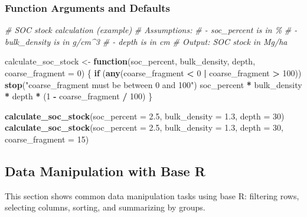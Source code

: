 \documentclass[
  10pt,
  b5paper,
  oneside]{book}
\newenvironment{Shaded}{\begin{snugshade}}{\end{snugshade}}
\newcommand{\AttributeTok}[1]{\textcolor[rgb]{0.13,0.29,0.53}{#1}}
\newcommand{\CommentTok}[1]{\textcolor[rgb]{0.56,0.35,0.01}{\textit{#1}}}
\newcommand{\ControlFlowTok}[1]{\textcolor[rgb]{0.13,0.29,0.53}{\textbf{#1}}}
\newcommand{\DecValTok}[1]{\textcolor[rgb]{0.00,0.00,0.81}{#1}}
\newcommand{\FloatTok}[1]{\textcolor[rgb]{0.00,0.00,0.81}{#1}}
\newcommand{\FunctionTok}[1]{\textcolor[rgb]{0.13,0.29,0.53}{\textbf{#1}}}
\newcommand{\NormalTok}[1]{#1}
\newcommand{\OtherTok}[1]{\textcolor[rgb]{0.56,0.35,0.01}{#1}}
\newcommand{\SpecialCharTok}[1]{\textcolor[rgb]{0.81,0.36,0.00}{\textbf{#1}}}
\newcommand{\StringTok}[1]{\textcolor[rgb]{0.31,0.60,0.02}{#1}}
\begin{document}
\subsubsection{Function Arguments and Defaults}\label{arguments-functions}

\begin{Shaded}
\begin{Highlighting}[]
\CommentTok{\# SOC stock calculation (example)}
\CommentTok{\# Assumptions:}
\CommentTok{\# {-} soc\_percent is in \%}
\CommentTok{\# {-} bulk\_density is in g/cm\^{}3}
\CommentTok{\# {-} depth is in cm}
\CommentTok{\# Output: SOC stock in Mg/ha}

\NormalTok{calculate\_soc\_stock }\OtherTok{\textless{}{-}} \ControlFlowTok{function}\NormalTok{(soc\_percent, bulk\_density, depth, }\AttributeTok{coarse\_fragment =} \DecValTok{0}\NormalTok{) \{}
  \ControlFlowTok{if}\NormalTok{ (}\FunctionTok{any}\NormalTok{(coarse\_fragment }\SpecialCharTok{\textless{}} \DecValTok{0} \SpecialCharTok{|}\NormalTok{ coarse\_fragment }\SpecialCharTok{\textgreater{}} \DecValTok{100}\NormalTok{)) }\FunctionTok{stop}\NormalTok{(}\StringTok{"coarse\_fragment must be between 0 and 100"}\NormalTok{)}
\NormalTok{  soc\_percent }\SpecialCharTok{*}\NormalTok{ bulk\_density }\SpecialCharTok{*}\NormalTok{ depth }\SpecialCharTok{*}\NormalTok{ (}\DecValTok{1} \SpecialCharTok{{-}}\NormalTok{ coarse\_fragment }\SpecialCharTok{/} \DecValTok{100}\NormalTok{)}
\NormalTok{\}}

\FunctionTok{calculate\_soc\_stock}\NormalTok{(}\AttributeTok{soc\_percent =} \FloatTok{2.5}\NormalTok{, }\AttributeTok{bulk\_density =} \FloatTok{1.3}\NormalTok{, }\AttributeTok{depth =} \DecValTok{30}\NormalTok{)}
\FunctionTok{calculate\_soc\_stock}\NormalTok{(}\AttributeTok{soc\_percent =} \FloatTok{2.5}\NormalTok{, }\AttributeTok{bulk\_density =} \FloatTok{1.3}\NormalTok{, }\AttributeTok{depth =} \DecValTok{30}\NormalTok{, }\AttributeTok{coarse\_fragment =} \DecValTok{15}\NormalTok{)}
\end{Highlighting}
\end{Shaded}

\subsection{Data Manipulation with Base R}\label{R-data-manipulation}

This section shows common data manipulation tasks using base R: filtering rows, selecting columns, sorting, and summarizing by groups.
\end{document}
